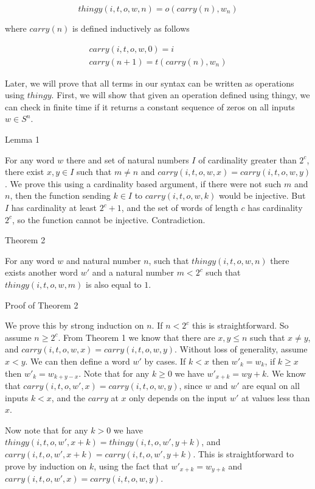 \documentclass[12pt]{article} %
\theoremstyle{definition}
\theoremstyle{definition}
\theoremstyle{definition}
\theoremstyle{definition}
\begin{document}
\begin{equation}
  thingy(i, t, o, w, n) = o(carry(n), w_{n})
\end{equation}

where $carry(n)$ is defined inductively as follows

\begin{equation}
  \begin{aligned}
    carry(i, t, o, w, 0) = i \\
    carry(n+1) = t(carry(n), w_{n})
  \end{aligned}
\end{equation}

Later, we will prove that all terms in our syntax can be written as operations using $thingy$.
First, we will show that given an operation defined using thingy, we can check in finite
time if it returns a constant sequence of zeros on all inputs $w \in S^n$.

Lemma 1

For any word $w$ there and set of natural numbers $I$ of cardinality greater
than $2^c$, there exist $x, y \in I$ such that $m \ne n$ and
$carry(i, t, o, w, x) = carry(i, t, o, w, y)$. We prove this using a
cardinality based argument, if there were not such $m$ and $n$,
then the function sending $k \in I$ to $carry(i, t, o, w, k)$ would be injective.
But $I$ has cardinality at least $2^c + 1$,
and the set of words of length $c$ has cardinality $2^c$, so the function cannot
be injective. Contradiction.

Theorem 2

For any word $w$ and natural number $n$, such that
$thingy(i, t, o, w, n)$ there exists another word $w'$ and
a natural number $m < 2^c$ such that $thingy(i, t, o, w, m)$ is also equal to $1$.

Proof of Theorem 2

We prove this by strong induction on $n$.
If $n < 2^c$ this is straightforward. So assume $n \ge 2^c$. From
Theorem 1 we know that there are $x, y \le n$ such that $x \ne y$,
and $carry(i, t, o, w, x) = carry(i, t, o, w, y)$.
Without loss of generality, assume $x < y$. We can then define a word $w'$
by cases. If $k < x$ then $w'_k = w_k$, if $k \ge x$ then $w'_k = w_{k + y - x}$.
Note that for any $k \ge 0$ we have $w'_{x+k} = w{y+k}$.
We know that $carry(i, t, o, w', x) = carry(i, t, o, w, y)$, since
$w$ and $w'$ are equal on all inputs $k < x$, and the $carry$
at $x$ only depends on the input $w'$ at values less than $x$.

Now note that for any $k > 0$ we have $thingy(i, t, o, w', x+k) = thingy(i, t, o, w', y+k)$,
and $carry(i, t, o, w', x+k) = carry(i, t, o, w', y+k)$. This is straightforward to
prove by induction on $k$, using the fact that $w'_{x+k} = w_{y+k}$ and
$carry(i, t, o, w', x) = carry(i, t, o, w, y)$.
\end{document}
